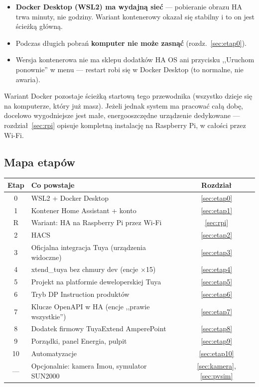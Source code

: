 \documentclass[11pt,a4paper]{article}
\begin{document}
\begin{itemize}
\item \textbf{Docker Desktop (WSL2) ma wydajną sieć} --- pobieranie obrazu HA trwa minuty, nie godziny. Wariant kontenerowy okazał się stabilny i to on jest ścieżką główną.
\item Podczas długich pobrań \textbf{komputer nie może zasnąć} (rozdz.~\ref{sec:etap0}).
\item Wersja kontenerowa nie ma sklepu dodatków HA OS ani przycisku ,,Uruchom ponownie'' w menu --- restart robi się w Docker Desktop (to normalne, nie awaria).
\end{itemize}

Wariant Docker pozostaje ścieżką startową tego przewodnika (wszystko dzieje się na komputerze, który już masz). Jeżeli jednak system ma pracować całą dobę, docelowo wygodniejsze jest małe, energooszczędne urządzenie dedykowane --- rozdział~\ref{sec:rpi} opisuje kompletną instalację na Raspberry Pi, w całości przez Wi-Fi.

\subsection{Mapa etapów}

\begin{center}
\begin{tabular}{clc}
\toprule
\textbf{Etap} & \textbf{Co powstaje} & \textbf{Rozdział}\\
\midrule
0 & WSL2 + Docker Desktop & \ref{sec:etap0}\\
1 & Kontener Home Assistant + konto & \ref{sec:etap1}\\
R & Wariant: HA na Raspberry Pi przez Wi-Fi & \ref{sec:rpi}\\
2 & HACS & \ref{sec:etap2}\\
3 & Oficjalna integracja Tuya (urządzenia widoczne) & \ref{sec:etap3}\\
4 & xtend\_tuya bez chmury dev (encje $\times$15) & \ref{sec:etap4}\\
5 & Projekt na platformie deweloperskiej Tuya & \ref{sec:etap5}\\
6 & Tryb DP Instruction produktów & \ref{sec:etap6}\\
7 & Klucze OpenAPI w HA (encje ,,prawie wszystkie'') & \ref{sec:etap7}\\
8 & Dodatek firmowy TuyaExtend AmperePoint & \ref{sec:etap8}\\
9 & Porządki, panel Energia, pulpit & \ref{sec:etap9}\\
10 & Automatyzacje & \ref{sec:etap10}\\
--- & Opcjonalnie: kamera Imou, symulator SUN2000 & \ref{sec:kamera}, \ref{sec:pvsim}\\
\bottomrule
\end{tabular}
\end{center}
\end{document}
